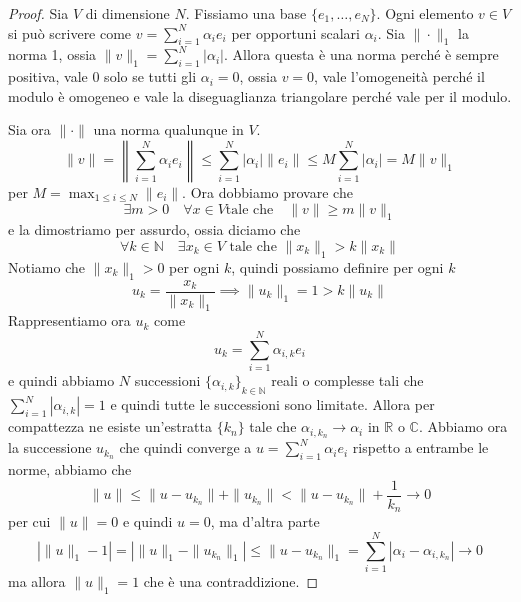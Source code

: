 \begin{proof}
    Sia \(V\) di dimensione \(N\). Fissiamo una base \(\{e_{1}, \ldots,
    e_{N}\}\). Ogni elemento \(v \in V\) si può scrivere come \(v =
    \sum_{i=1}^{N} \alpha_{i}e_{i}\) per opportuni scalari \(\alpha_i\). Sia
    \(\|\cdot \|_1\) la norma 1, ossia \(\|v\|_1 = \sum_{i=1}^{N}
    |\alpha_{i}|\). Allora questa è una norma perché è sempre positiva, vale 0
    solo se tutti gli \(\alpha_{i} = 0\), ossia \(v = 0\), vale l'omogeneità
    perché il modulo è omogeneo e vale la diseguaglianza triangolare perché vale
    per il modulo.

    Sia ora \(\|\cdot \|\) una norma qualunque in \(V\).
    \[
        \|v\| = \left\| \sum_{i=1}^{N} \alpha_{i}e_{i} \right\| \le
        \sum_{i=1}^{N} |\alpha_{i}|\|e_{i}\| \le M \sum_{i=1}^{N} |\alpha_{i}| =
        M \|v\|_1
    \]
    per \(\displaystyle M = \max_{1 \le i \le N} \|e_{i}\| \). Ora dobbiamo
    provare che
    \[
        \exists m > 0 \quad \forall x \in V \text{tale che} \quad \|v\| \ge m \|v\|_1
    \]
    e la dimostriamo per assurdo, ossia diciamo che 
    \[
        \forall k \in \mathbb{N} \quad \exists x_k \in V \text{ tale che } \|x_k\|_1 > k
        \|x_k\|
    \]
    Notiamo che \(\|x_k\|_1 > 0\) per ogni \(k\), quindi possiamo definire per
    ogni \(k\) 
    \[
        u_k = \frac{x_k}{\|x_k\|_1} \implies \|u_k\|_1 = 1 > k \|u_k\|
    \]
    Rappresentiamo ora \(u_k\) come
    \[
        u_k = \sum_{i=1}^{N} \alpha_{i,k}e_{i} 
    \]
e quindi abbiamo \(N\) successioni \({\{\alpha_{i,k}\}}_{k \in \mathbb{N}}\)
    reali o complesse tali che \(\sum_{i=1}^{N} |\alpha_{i,k}| = 1\) e quindi
    tutte le successioni sono limitate. Allora per compattezza ne esiste
    un'estratta \(\{k_n\} \) tale che \(\alpha_{i, k_n} \to \alpha_{i}\) in
    \(\mathbb{R}\) o \(\mathbb{C}\). Abbiamo ora la successione \(u_{k_n}\) che
    quindi converge a \(u = \sum_{i=1}^{N} \alpha_{i}e_{i}\) rispetto a entrambe
    le norme, abbiamo che
    \[
        \|u\| \le \|u - u_{k_n} \| + \|u_{k_n} \| < \|u - u_{k_n} \| +
        \frac{1}{k_n} \to 0
    \]
    per cui \(\|u\| = 0\) e quindi \(u = 0\), ma d'altra parte
    \[
        \left| \|u\|_1 - 1 \right| = \left| \|u\|_1 - \|u_{k_n} \|_1 \right| \le
        \|u - u_{k_n} \|_1 = \sum_{i=1}^{N} |\alpha_{i} - \alpha_{i, k_n}| \to 0 
    \]
    ma allora \(\|u\|_1 = 1\) che è una contraddizione.
\end{proof}

